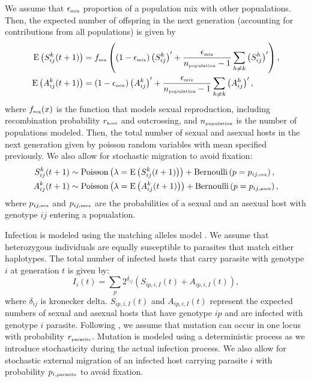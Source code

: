 \documentclass{article}\usepackage[]{graphicx}\usepackage[]{color}
\begin{document}
We assume that $\epsilon_{\textrm{\tiny mix}}$ proportion of a population mix with other popualations.
Then, the expected number of offspring in the next generation (accounting for contributions from all populations) is given by
\begin{equation}
\begin{aligned}
\mathrm{E}\left(S_{ij}^k(t+1)\right) &= f_{\textrm{\tiny sex}}\left((1 - \epsilon_{\textrm{\tiny mix}}) \left(S_{ij}^k\right)' + \frac{\epsilon_{\textrm{\tiny mix}}}{n_{\textrm{\tiny population}}-1} \sum_{h \neq k} \left(S_{ij}^h\right)'\right),\\
\mathrm{E}\left(A_{ij}^k(t+1)\right) &= (1 - \epsilon_{\textrm{\tiny mix}}) \left(A_{ij}^k\right)' + \frac{\epsilon_{\textrm{\tiny mix}}}{n_{\textrm{\tiny population}}-1} \sum_{h \neq k} \left(A_{ij}^h\right)',\\
\end{aligned}
\end{equation}
where $f_{\textrm{\tiny sex}}(x)$ is the function that models sexual reproduction, including recombination probability $r_{\textrm{\tiny host}}$ and outcrossing, and $n_{\textrm{\tiny population}}$ is the number of populations modeled.
Then, the total number of sexual and asexual hosts in the next generation given by poisson random variables with mean specified previously. We also allow for stochastic migration to avoid fixation:
\begin{equation}
\begin{aligned}
S_{ij}^k(t+1) &\sim \mathrm{Poisson}\left(\lambda=\mathrm{E}\left(S_{ij}^k(t+1)\right)\right) + \mathrm{Bernoulli}\left(p=p_{ij,\textrm{\tiny sex}}\right),\\
A_{ij}^k(t+1) &\sim \mathrm{Poisson}\left(\lambda=\mathrm{E}\left(A_{ij}^k(t+1)\right)\right) + \mathrm{Bernoulli}\left(p=p_{ij, \textrm{\tiny asex}}\right),
\end{aligned}
\end{equation}
where $p_{ij,\textrm{\tiny sex}}$ and $p_{ij, \textrm{\tiny asex}}$ are the probabilities of a sexual and an asexual host with genotype $ij$ entering a popualation.

Infection is modeled using the matching alleles model \citep{otto1998evolution}.
We assume that heterozygous individuals are equally susceptible to parasites that match either haplotypes.
The total number of infected hosts that carry parasite with genotype $i$ at generation $t$ is given by:
\begin{equation}
I_{i}(t) = \sum_{p} 2^{\delta_{ij}} \left( S_{ip,i,I}(t) + A_{ip,i,I}(t)\right),
\end{equation}
where $\delta_{ij}$ is kronecker delta.
$S_{ip,i,I}(t)$ and $A_{ip,i,I}(t)$ represent the expected numbers of sexual and asexual hosts that have genotype $ip$ and are infected with genotype $i$ parasite. 
Following \cite{ashby2015diversity}, we assume that mutation can occur in one locus with probability $r_{\textrm{\tiny parasite}}$. 
Mutation is modeled using a deterministic process as we introduce stochasticity during the actual infection process.
We also allow for stochastic external migration of an infected host carrying parasite $i$ with probability $p_{i, \textrm{\tiny parasite}}$ to avoid fixation.
\end{document}
